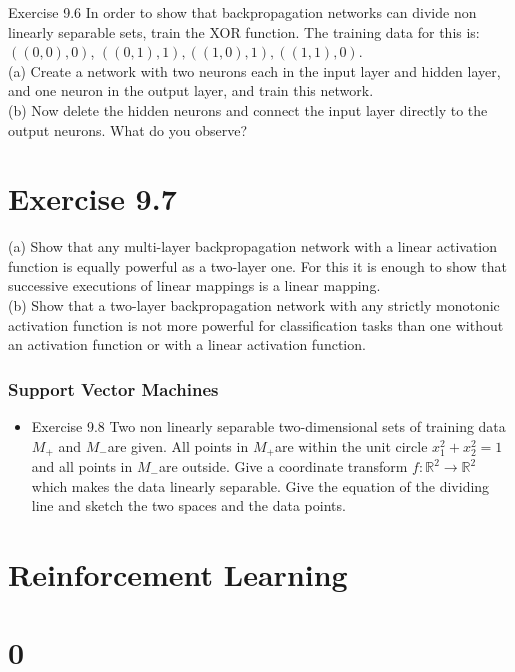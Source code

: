 \documentclass[10pt]{article}
\begin{document}
Exercise 9.6 In order to show that backpropagation networks can divide non linearly separable sets, train the XOR function. The training data for this is: $((0,0), 0)$, $((0,1), 1),((1,0), 1),((1,1), 0)$.\\
(a) Create a network with two neurons each in the input layer and hidden layer, and one neuron in the output layer, and train this network.\\
(b) Now delete the hidden neurons and connect the input layer directly to the output neurons. What do you observe?

\section*{Exercise 9.7}
(a) Show that any multi-layer backpropagation network with a linear activation function is equally powerful as a two-layer one. For this it is enough to show that successive executions of linear mappings is a linear mapping.\\
(b) Show that a two-layer backpropagation network with any strictly monotonic activation function is not more powerful for classification tasks than one without an activation function or with a linear activation function.

\subsubsection*{Support Vector Machines}
\begin{itemize}
  \item Exercise 9.8 Two non linearly separable two-dimensional sets of training data $M_{+}$ and $M_{-}$are given. All points in $M_{+}$are within the unit circle $x_{1}^{2}+x_{2}^{2}=1$ and all points in $M_{-}$are outside. Give a coordinate transform $f: \mathbb{R}^{2} \rightarrow \mathbb{R}^{2}$ which makes the data linearly separable. Give the equation of the dividing line and sketch the two spaces and the data points.
\end{itemize}

\section*{Reinforcement Learning}
\section*{0}
\end{document}
